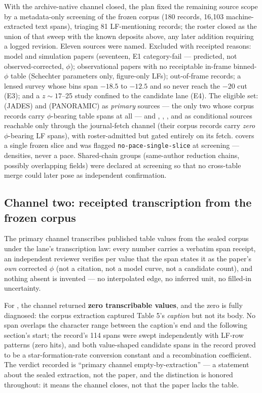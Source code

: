 \documentclass[twocolumn]{aastex702}
\begin{document}
With the archive-native channel closed, the plan fixed the remaining source scope by a
metadata-only screening of the frozen corpus (180 records, 16{,}103 machine-extracted
text spans), triaging 81 LF-mentioning records; the roster closed as the union of that
sweep with the known deposits above, any later addition requiring a logged revision.
Eleven sources were named. Excluded with receipted reasons: model and simulation papers
(seventeen, E1 category-fail --- predicted, not observed-corrected, $\phi$); observational
papers with no receiptable in-frame binned-$\phi$ table (Schechter parameters only,
figure-only LFs); out-of-frame records; a lensed survey whose bins span $-18.5$ to
$-12.5$ and so never reach the $-20$ cut (E3); and a $z\sim17$--25 study confined to the
candidate lane (E4). The eligible set: \citet{whitler25} (JADES) and \citet{weibel26}
(PANORAMIC) as \emph{primary} sources --- the only two whose corpus records carry
$\phi$-bearing table spans at all --- and \citet{harikane23}, \citet{harikane24},
\citet{finkelstein24}, and \citet{rojasruiz25} as conditional sources reachable only
through the journal-fetch channel (their corpus records carry \emph{zero} $\phi$-bearing
LF spans), with \citet{donnan23} roster-admitted but gated entirely on its fetch.
\citet{rojasruiz25} covers a single frozen slice and was flagged
\texttt{no-pace-single-slice} at screening --- densities, never a pace. Shared-chain
groups (same-author reduction chains, possibly overlapping fields) were declared at
screening so that no cross-table merge could later pose as independent confirmation.

\subsection{Channel two: receipted transcription from the frozen corpus} \label{sec:chan2}

The primary channel transcribes published table values from the sealed corpus under the
lane's transcription law: every number carries a verbatim span receipt, an independent
reviewer verifies per value that the span states it as the paper's \emph{own} corrected
$\phi$ (not a citation, not a model curve, not a candidate count), and nothing absent is
invented --- no interpolated edge, no inferred unit, no filled-in uncertainty.

For \citet{whitler25}, the channel returned \textbf{zero transcribable values}, and the
zero is fully diagnosed: the corpus extraction captured Table 5's \emph{caption} but not
its body. No span overlaps the character range between the caption's end and the
following section's start; the record's 114 spans were swept independently with LF-row
patterns (zero hits), and both value-shaped candidate spans in the record proved to be a
star-formation-rate conversion constant and a recombination coefficient. The verdict
recorded is ``primary channel empty-by-extraction'' --- a statement about the sealed
extraction, not the paper, and the distinction is honored throughout: it means the
channel closes, not that the paper lacks the table.
\end{document}
